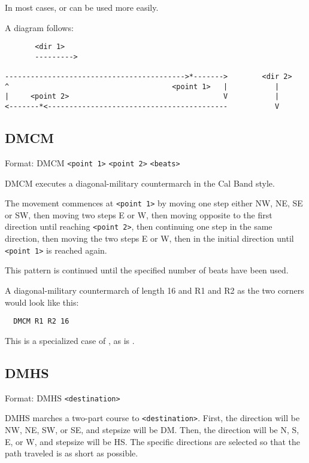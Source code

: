 In most cases,  or  can be used
more easily.

A diagram follows:
                                         
\begin{verbatim}
       <dir 1>
       --------->

------------------------------------------>*------->        <dir 2>
^                                      <point 1>   |           |
|     <point 2>                                    V           |
<-------*<------------------------------------------           V
\end{verbatim}

\subsection{DMCM}\label{dmcm}

Format: DMCM \verb$<point 1>$ \verb$<point 2>$ \verb$<beats>$

DMCM executes a diagonal-military countermarch in the Cal Band style.

The movement commences at \verb$<point 1>$ by moving one step either NW, NE,
SE or SW, then moving two steps E or W, then moving opposite to the first
direction until reaching \verb$<point 2>$, then continuing one step in the
same direction, then moving the two steps E or W, then in the initial
direction until \verb$<point 1>$ is reached again.

This pattern is continued until the specified number of beats have been used.

A diagonal-military countermarch of length 16 and R1 and R2 as the two
corners would look like this:
\begin{verbatim}
  DMCM R1 R2 16
\end{verbatim}

This is a specialized case of , as is
.

\subsection{DMHS}\label{dmhs}

Format: DMHS \verb$<destination>$

DMHS marches a two-part course to \verb$<destination>$.  First, the
direction will be NW, NE, SW, or SE, and stepsize will be DM.  Then,
the direction will be N, S, E, or W, and stepsize will be HS.  The
specific directions are selected so that the path traveled is as short
as possible.

